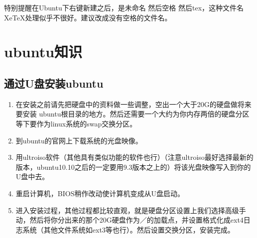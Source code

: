 \documentclass[11pt,oneside]{book}
\begin{document}
特别提醒在Ubuntu下右键新建之后，是未命名 然后空格 然后tex，这种文件名XeTeX处理似乎不很好。建议改成没有空格的文件名。


\chapter{ubuntu知识}
\section{通过U盘安装ubuntu}
\begin{enumerate}
\item  在安装之前请先把硬盘中的资料做一些调整，空出一个大于20G的硬盘做将来要安装 ubuntu根目录的地方。然后还需要一个大约为你内存两倍的硬盘分区等下要作为linux系统的swap交换分区。
\item 到ubuntu的官网上下载系统的光盘映像。
\item 用ultroiso软件（其他具有类似功能的软件也行）（注意ultroiso最好选择最新的版本，ubuntu10.10之后的一定要用9.3版本之上的）将该光盘映像写入到你的U盘中去。
\item 重启计算机，BIOS稍作改动使计算机变成从U盘启动。
\item 进入安装过程，其他过程都比较直观，就是硬盘分区设置上我们选择高级手动，然后将你分出来的那个20G硬盘作为／的加载点，并设置格式化成ext4日志系统（其他文件系统如ext3等也行）。然后设置交换分区，安装完成。
\end{enumerate}
\end{document}
